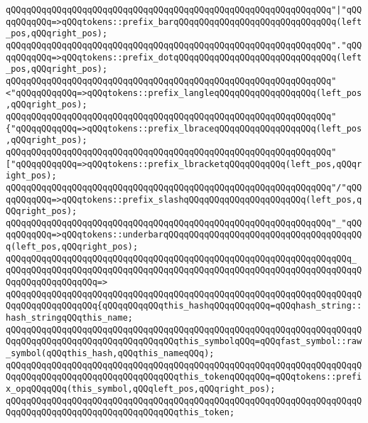 \newline
\verb|qQQqqQQqqQQqqQQqqQQqqQQqqQQqqQQqqQQqqQQqqQQqqQQqqQQqqQQqqQQqqQQq"|\verb#|"qQQqqQQqqQQq=>qQQqtokens::prefix_barqQQqqQQqqQQqqQQqqQQqqQQqqQQqqQQq(left_pos,qQQqright_pos);#\newline
\verb|qQQqqQQqqQQqqQQqqQQqqQQqqQQqqQQqqQQqqQQqqQQqqQQqqQQqqQQqqQQqqQQq"."qQQqqQQqqQQq=>qQQqtokens::prefix_dotqQQqqQQqqQQqqQQqqQQqqQQqqQQqqQQq(left_pos,qQQqright_pos);|\newline
\verb|qQQqqQQqqQQqqQQqqQQqqQQqqQQqqQQqqQQqqQQqqQQqqQQqqQQqqQQqqQQqqQQq"<"qQQqqQQqqQQq=>qQQqtokens::prefix_langleqQQqqQQqqQQqqQQqqQQq(left_pos,qQQqright_pos);|\newline
\verb|qQQqqQQqqQQqqQQqqQQqqQQqqQQqqQQqqQQqqQQqqQQqqQQqqQQqqQQqqQQqqQQq"{"qQQqqQQqqQQq=>qQQqtokens::prefix_lbraceqQQqqQQqqQQqqQQqqQQq(left_pos,qQQqright_pos);|\newline
\verb|qQQqqQQqqQQqqQQqqQQqqQQqqQQqqQQqqQQqqQQqqQQqqQQqqQQqqQQqqQQqqQQq"["qQQqqQQqqQQq=>qQQqtokens::prefix_lbracketqQQqqQQqqQQq(left_pos,qQQqright_pos);|\newline
\verb|qQQqqQQqqQQqqQQqqQQqqQQqqQQqqQQqqQQqqQQqqQQqqQQqqQQqqQQqqQQqqQQq"/"qQQqqQQqqQQq=>qQQqtokens::prefix_slashqQQqqQQqqQQqqQQqqQQqqQQq(left_pos,qQQqright_pos);|\newline
\verb|qQQqqQQqqQQqqQQqqQQqqQQqqQQqqQQqqQQqqQQqqQQqqQQqqQQqqQQqqQQqqQQq"_"qQQqqQQqqQQq=>qQQqtokens::underbarqQQqqQQqqQQqqQQqqQQqqQQqqQQqqQQqqQQqqQQq(left_pos,qQQqright_pos);|\newline
\verb|qQQqqQQqqQQqqQQqqQQqqQQqqQQqqQQqqQQqqQQqqQQqqQQqqQQqqQQqqQQqqQQqqQQq_|\newline
\verb|qQQqqQQqqQQqqQQqqQQqqQQqqQQqqQQqqQQqqQQqqQQqqQQqqQQqqQQqqQQqqQQqqQQqqQQqqQQqqQQqqQQqqQQq=>|\newline
\verb|qQQqqQQqqQQqqQQqqQQqqQQqqQQqqQQqqQQqqQQqqQQqqQQqqQQqqQQqqQQqqQQqqQQqqQQqqQQqqQQqqQQqqQQq{qQQqqQQqqQQqthis_hashqQQqqQQqqQQq=qQQqhash_string::hash_stringqQQqthis_name;|\newline
\verb|qQQqqQQqqQQqqQQqqQQqqQQqqQQqqQQqqQQqqQQqqQQqqQQqqQQqqQQqqQQqqQQqqQQqqQQqqQQqqQQqqQQqqQQqqQQqqQQqqQQqqQQqthis_symbolqQQq=qQQqfast_symbol::raw_symbol(qQQqthis_hash,qQQqthis_nameqQQq);|\newline
\verb|qQQqqQQqqQQqqQQqqQQqqQQqqQQqqQQqqQQqqQQqqQQqqQQqqQQqqQQqqQQqqQQqqQQqqQQqqQQqqQQqqQQqqQQqqQQqqQQqqQQqqQQqthis_tokenqQQqqQQq=qQQqtokens::prefix_opqQQqqQQq(this_symbol,qQQqleft_pos,qQQqright_pos);|\newline
\newline
\verb|qQQqqQQqqQQqqQQqqQQqqQQqqQQqqQQqqQQqqQQqqQQqqQQqqQQqqQQqqQQqqQQqqQQqqQQqqQQqqQQqqQQqqQQqqQQqqQQqqQQqqQQqthis_token;|\newline
